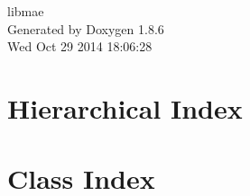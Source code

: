 \documentclass[twoside]{book}
\newcommand{\clearemptydoublepage}{%
  \newpage{\pagestyle{empty}\cleardoublepage}%
}
\begin{document}
\hypersetup{pageanchor=false}
\begin{titlepage}
\vspace*{7cm}
\begin{center}%
{\Large libmae }\\
\vspace*{1cm}
{\large Generated by Doxygen 1.8.6}\\
\vspace*{0.5cm}
{\small Wed Oct 29 2014 18:06:28}\\
\end{center}
\end{titlepage}
\clearemptydoublepage
\tableofcontents
\clearemptydoublepage
{}
\hypersetup{pageanchor=true}

\chapter{Hierarchical Index}

\chapter{Class Index}

\end{document}
